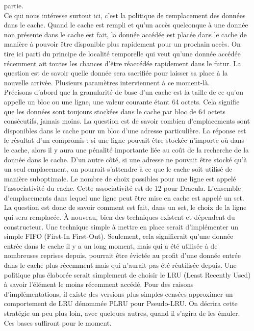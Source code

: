 \documentclass{report}
\begin{document}
partie.
\\Ce qui nous intéresse surtout ici, c'est la politique de remplacement des données dans le cache. 
Quand le cache est rempli et qu'un accès quelconque à une donnée non présente dans le cache est
fait, la donnée accédée est placée dans le cache de manière à pouvoir être disponible plus 
rapidement pour un prochain accès. On tire ici parti du principe de localité temporelle qui 
veut qu'une donnée accédée récemment ait toutes les chances d'être réaccédée rapidement dans 
le futur. La question est de savoir quelle donnée sera sacrifiée pour laisser sa place à la
nouvelle arrivée. Plusieurs paramètres interviennent à ce moment-là.
\\Précisons d'abord que la granularité de base d'un cache est la taille de ce qu'on appelle
un bloc ou une ligne, une valeur courante étant 64 octets. Cela signifie que les données
sont toujours stockées dans le cache par bloc de 64 octets consécutifs, jamais moins. La
question est de savoir combien d'emplacements sont disponibles dans le cache pour un bloc
d'une adresse particulière. La réponse est le résultat d'un compromis : si une ligne pouvait
être stockée n'importe où dans le cache, alors il y aura une pénalité importante liée au coût
de la recherche de la donnée dans le cache. D'un autre côté, si une adresse ne pouvait être
stocké qu'à un seul emplacement, on pourrait s'attendre à ce que le cache soit utilisé de 
manière suboptimale. Le nombre de choix possibles pour une ligne est appelé l'associativité
du cache. Cette associativité est de 12 pour Dracula. L'ensemble d'emplacements dans lequel
une ligne peut être mise en cache est appelé un set.
\\La question est donc de savoir comment est fait, dans un set, le choix de la ligne qui sera
remplacée. À nouveau, bien des techniques existent et dépendent du constructeur. Une technique
simple à mettre en place serait d'implémenter un simple FIFO (First-In First-Out). Seulement,
cela signifierait qu'une donnée entrée dans le cache il y a un long moment, mais qui a été utilisée 
à de nombreuses reprises depuis, pourrait être évictée au profit d'une donnée entrée dans le cache 
plus récemment mais qui n'aurait pas été réutilisée depuis. Une politique plus élaborée serait
simplement de choisir le LRU (Least Recently Used) à savoir l'élément le moins récemment accédé. 
Pour des raisons d'implémentations, il existe des versions plus simples censées approximer un 
comportement de LRU dénommée PLRU pour Pseudo-LRU. On décrira cette stratégie un peu plus loin, 
avec quelques autres, quand il s'agira de les émuler. Ces bases suffiront pour le moment.
\section{}
 

\end{document}
